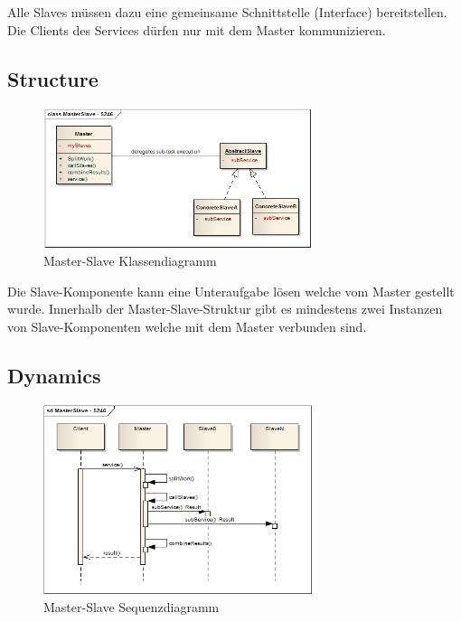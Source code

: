 Alle Slaves müssen dazu eine gemeinsame Schnittstelle (Interface) bereitstellen. Die Clients des Services dürfen nur mit dem Master kommunizieren.

\subsection*{Structure}

\begin{figure}[H]
	\centering
	\includegraphics[width=0.7\textwidth]{content/posa1/images/master-slave-classes.png}
	\caption{Master-Slave Klassendiagramm}
\end{figure}


Die Slave-Komponente kann eine Unteraufgabe lösen welche vom Master gestellt wurde. Innerhalb der Master-Slave-Struktur gibt es mindestens zwei Instanzen von Slave-Komponenten welche mit dem Master verbunden sind.

\subsection*{Dynamics}

\begin{figure}[H]
	\centering
	\includegraphics[width=0.7\textwidth]{content/posa1/images/master-slave-sequence.png}
	\caption{Master-Slave Sequenzdiagramm}
\end{figure}

